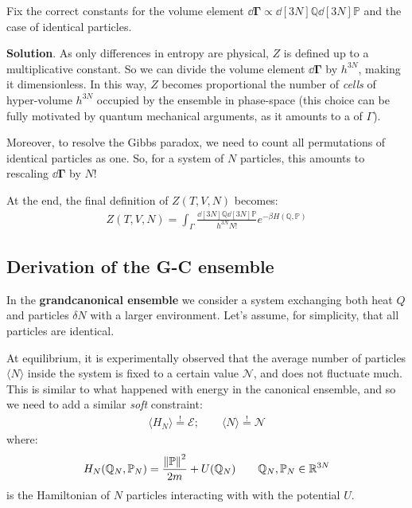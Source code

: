 \documentclass[../../main.tex]{subfiles}
\begin{document}
\begin{exo}[2]
    Fix the correct constants for the volume element $\dd{\bm{\Gamma}} \propto \dd[3N]{\mathbb{Q}} \dd[3N]{\mathbb{P}}$ and the case of identical particles.

    \medskip

    \textbf{Solution}. As only differences in entropy are physical, $Z$ is defined up to a multiplicative constant. So we can divide the volume element $\dd{\bm{\Gamma}}$ by $h^{3N}$, making it dimensionless. In this way, $Z$ becomes proportional the number of \textit{cells} of hyper-volume $h^{3N}$ occupied by the ensemble in phase-space (this choice can be fully motivated by quantum mechanical arguments, as it amounts to a  of $\Gamma$).

    \medskip

    Moreover, to resolve the Gibbs paradox, we need to count all permutations of identical particles as one. So, for a system of $N$ particles, this amounts to rescaling $\dd{\bm{\Gamma}}$ by $N!$

    \medskip

    At the end, the final definition of $Z(T,V,N)$ becomes:
    \begin{align*}
        Z(T,V,N) = \int_{\Gamma} \frac{\dd[3N]{\mathbb{Q}} \dd[3N]{\mathbb{P}}}{h^{3N} N!} e^{-\beta H(\mathbb{Q}, \mathbb{P})} 
    \end{align*}
\end{exo}

\subsection{Derivation of the G-C ensemble}
In the \textbf{grandcanonical ensemble} we consider a system exchanging both heat $Q$ and particles $\delta N$ with a larger environment. Let's assume, for simplicity, that all particles are identical.

\medskip

At equilibrium, it is experimentally observed that the average number of particles $\langle N \rangle$ inside the system is fixed to a certain value $\mathcal{N}$, and does not fluctuate much. This is similar to what happened with energy in the canonical ensemble, and so we need to add a similar \textit{soft} constraint:
\begin{align}\label{eqn:36}
    \langle H_N \rangle \overset{!}{=}  \mathcal{E}; \qquad \langle N  \rangle \overset{!}{=}  \mathcal{N}
\end{align}
where:
\begin{align*}
    H_N(\mathbb{Q}_N, \mathbb{P}_N) = \frac{\norm{\mathbb{P}}^2}{2m} + U(\mathbb{Q}_N)  \qquad \mathbb{Q}_N, \mathbb{P}_N \in \mathbb{R}^{3N}
\end{align*}
is the Hamiltonian of $N$ particles interacting with with the potential $U$.
\end{document}
